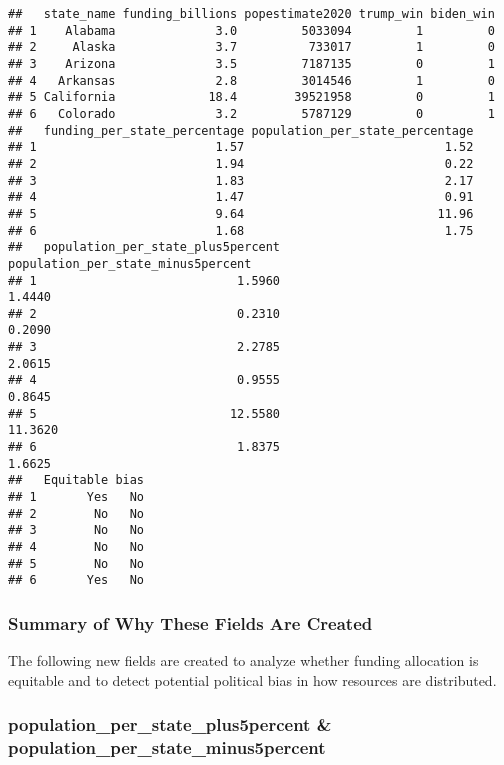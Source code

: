 \documentclass[
]{article}
\begin{document}
\begin{verbatim}
##   state_name funding_billions popestimate2020 trump_win biden_win
## 1    Alabama              3.0         5033094         1         0
## 2     Alaska              3.7          733017         1         0
## 3    Arizona              3.5         7187135         0         1
## 4   Arkansas              2.8         3014546         1         0
## 5 California             18.4        39521958         0         1
## 6   Colorado              3.2         5787129         0         1
##   funding_per_state_percentage population_per_state_percentage
## 1                         1.57                            1.52
## 2                         1.94                            0.22
## 3                         1.83                            2.17
## 4                         1.47                            0.91
## 5                         9.64                           11.96
## 6                         1.68                            1.75
##   population_per_state_plus5percent population_per_state_minus5percent
## 1                            1.5960                             1.4440
## 2                            0.2310                             0.2090
## 3                            2.2785                             2.0615
## 4                            0.9555                             0.8645
## 5                           12.5580                            11.3620
## 6                            1.8375                             1.6625
##   Equitable bias
## 1       Yes   No
## 2        No   No
## 3        No   No
## 4        No   No
## 5        No   No
## 6       Yes   No
\end{verbatim}

\subsubsection{Summary of Why These Fields Are
Created}\label{summary-of-why-these-fields-are-created}

The following new fields are created to analyze whether funding
allocation is equitable and to detect potential political bias in how
resources are distributed.

\subsubsection{population\_per\_state\_plus5percent \&
population\_per\_state\_minus5percent}\label{population_per_state_plus5percent-population_per_state_minus5percent}
\end{document}
